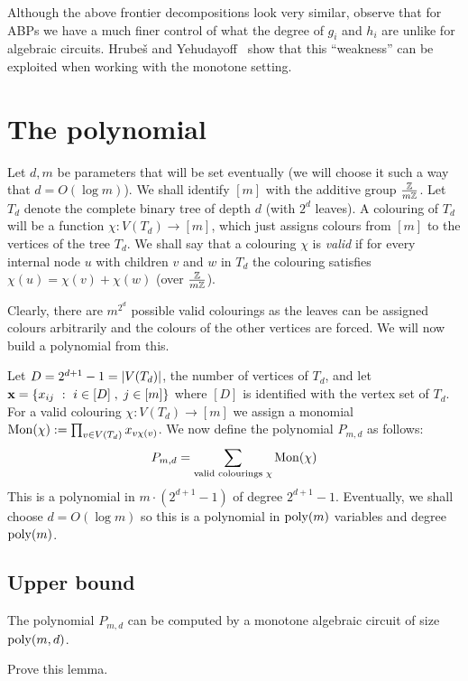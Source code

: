 Although the above frontier decompositions look very similar, observe that for ABPs we have a much finer control of what the degree of $g_i$ and $h_i$ are unlike for algebraic circuits. Hrube\v{s} and Yehudayoff~\cite{HY16} show that this ``weakness'' can be exploited when working with the monotone setting.

\section{The polynomial}

Let $d,m$ be parameters that will be set eventually (we will choose it such a way that $d = O(\log m)$).
We shall identify $[m]$ with the additive group $\frac{\mathbb{Z}}{m\mathbb{Z}}$. Let $T_d$ denote the complete binary tree of depth $d$ (with $2^d$ leaves). A colouring of $T_d$ will be a function $\chi:V(T_d) \rightarrow [m]$, which just assigns colours from $[m]$ to the vertices of the tree $T_d$. We shall say that a colouring $\chi$ is \emph{valid} if for every internal node $u$ with children $v$ and $w$ in $T_d$ the colouring satisfies $\chi(u) = \chi(v) + \chi(w)$ (over $\frac{\mathbb{Z}}{m\mathbb{Z}}$).

Clearly, there are $m^{2^d}$ possible valid colourings as the leaves can be assigned colours arbitrarily and the colours of the other vertices are forced. We will now build a polynomial from this.

Let $D = 2^{d+1}-1= \left|V(T_d)\right|$, the number of vertices of $T_d$, and let $\mathbf{x} = \left\{{x_{ij}}\ : \ {i\in [D]\;,\;j\in [m]}\right\}$ where $[D]$ is identified with the vertex set of $T_d$.
For a valid colouring $\chi:V(T_d)\rightarrow [m]$ we  assign a monomial $\operatorname{Mon}(\chi) := \prod_{v\in V(T_d)} x_{v\chi(v)}$. We now define the polynomial $P_{m,d}$ as follows:
\[
  P_{m,d} = \sum_{\text{valid colourings } \chi} \operatorname{Mon}(\chi)
\]
This is a polynomial in $m \cdot (2^{d+1} - 1)$ of degree $2^{d+1}-1$. Eventually, we shall choose $d = O(\log m)$ so this is a polynomial in $\operatorname{poly}(m)$ variables and degree $\operatorname{poly}(m)$.

\subsection*{Upper bound}

\begin{lemma}\label{lem:MonSep-upper-bound}
  The polynomial $P_{m,d}$ can be computed by a monotone algebraic circuit of size $\operatorname{poly}(m,d)$.
\end{lemma}

\begin{exercise}
  Prove this lemma.
\end{exercise}

